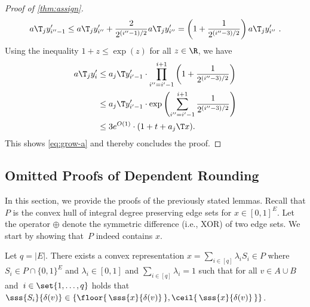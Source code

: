 \documentclass[a4paper,USenglish,cleveref,thm-restate]{lipics-v2021}
\begin{document}
\begin{proof}[Proof of \cref{thm:assign}]
\begin{equation*}
        a\T_j y'_{i''-1} \le a\T_j y'_{i''} + \frac{2}{2^{(i''-1)/2}} a\T_j y'_{i''} = \left(1 + \frac{1}{2^{(i''-3)/2}}\right) a\T_jy'_{i''} \ .
    \end{equation*}
    Using the inequality $1 + z \le \exp(z)$ for all $z\in\R$, we have
    \begin{align*}
        a\T_j y'_{i} 
        &\le a_j\T y'_{i' - 1} \cdot \prod_{i''=i'-1}^{i+1} \left(1 + \frac{1}{2^{(i''-3)/2}}\right) \\
        &\le a_j\T y'_{i' - 1} \cdot \exp\left(\sum_{i''=i'-1}^{i+1} \frac{1}{2^{(i''-3)/2}}\right) \\
        &\le 3 e^{O(1)} \cdot (1 + t + a_j\T x) .
    \end{align*}
    This shows \cref{eq:grow-a} and thereby concludes the proof.
\end{proof}

\subsection{Omitted Proofs of Dependent Rounding}
\label{subsec:appendix-ommitted-proofs-of-dependent-rounding}

In this section, we provide the proofs of the previously stated lemmas.
Recall that $P$ is the convex hull of integral degree preserving edge sets for $x\in [0,1]^E$.
Let the operator $\oplus$ denote the symmetric difference (i.e., XOR) of two edge sets.
We start by showing that~$P$ indeed contains $x$.

\begin{lemma}
    \label{lem:convex-hull-of-edge-preserving-edge-sets}
    Let $q = |E|$.
    There exists a convex representation $x = \sum_{i \in [q]} \lambda_i S_i \in P$ where $S_i \in P\cap\{0,1\}^E$ and $\lambda_i \in [0,1]$ and
    $\sum_{i \in [q]} \lambda_i = 1$ such that for all $v\in A\cup B$ and~$i \in \set{1,\dotsc,q}$ holds that $\sss{S_i}{\delta(v)} \in \{\floor{\,\sss{x}{\delta(v)}\,}, \ceil{ \,\sss{x}{\delta(v)} \,}\}$.
\end{lemma}
\end{document}
